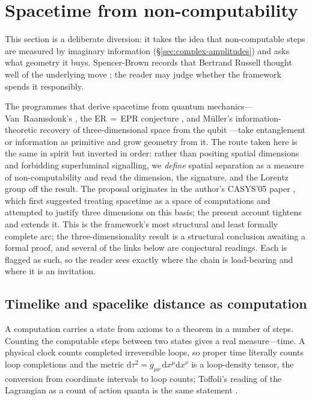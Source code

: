 \section{Spacetime from non-computability}
\label{sec:space-of-computations}

This section is a deliberate diversion: it takes the idea that non-computable steps are measured
by imaginary information (\S\ref{sec:complex-amplitudes}) and asks what geometry it buys.
Spencer-Brown records that Bertrand Russell thought well of the underlying move
\autocite{Spence-Brown-1969}; the reader may judge whether the framework spends it responsibly.

The programmes that derive spacetime from quantum mechanics---Van~Raamsdonk's
 \autocite{VanRaamsdonk2010}, the
ER\,$=$\,EPR conjecture \autocite{MaldacenaSusskind2013}, and M\"uller's
information-theoretic recovery of three-dimensional space from the qubit
\autocite{MuellerMasanes2013}---take entanglement or information as primitive and
grow geometry from it. The route taken here is the same in spirit but inverted in
order: rather than positing spatial dimensions and forbidding superluminal
signalling, we \emph{define} spatial separation as a measure of non-computability
and read the dimension, the signature, and the Lorentz group off the result. The
proposal originates in the author's CASYS'05 paper \autocite{small_2006}, which
first suggested treating spacetime as a space of computations and attempted to
justify three dimensions on this basis; the present account tightens and extends
it. This is the framework's most structural and least formally complete arc; the
three-dimensionality result is a structural conclusion awaiting a formal proof,
and several of the links below are conjectural readings. Each is flagged as such,
so the reader sees exactly where the chain is load-bearing and where it is an
invitation.

\subsection{Timelike and spacelike distance as computation}
\label{sec:comp-distance}

A computation carries a state from axioms to a theorem in a number of steps.
Counting the computable steps between two states gives a real measure---time. A
physical clock counts completed irreversible loops, so proper time literally
counts loop completions and the metric $\mathrm{d}\tau^{2}=g_{\mu\nu}\,
\mathrm{d}x^{\mu}\mathrm{d}x^{\nu}$ is a loop-density tensor, the conversion from
coordinate intervals to loop counts; Toffoli's reading of the Lagrangian as a
count of action quanta is the same statement \autocite{toffoli_2003}.

